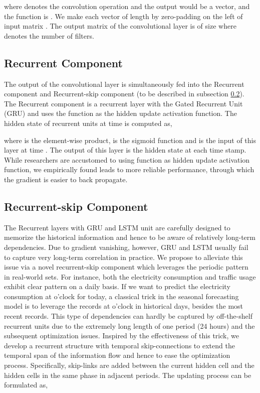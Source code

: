 \documentclass[sigconf]{acmart}
\begin{document}
where  denotes the convolution operation and the output  would be a vector, and the  function is . We make each vector  of length  by zero-padding on the left of input matrix . The output matrix of the convolutional layer is of size 
where  denotes the number of filters.

\subsection{Recurrent Component}
The output of the convolutional layer is simultaneously fed into the Recurrent component and Recurrent-skip component (to be described in subsection \ref{subsec:recurrent-skip}). The Recurrent component is a recurrent layer with the Gated Recurrent Unit (GRU) \cite{chung2014empirical} and uses the  function as the hidden update activation function. The hidden state of recurrent units at time  is computed as,



where  is the element-wise product,  is the sigmoid function and  is the input of this layer at time . The output of this layer is the hidden state at each time stamp. While researchers are accustomed to using  function as hidden update activation function, we empirically found  leads to more reliable performance, through which the gradient is easier to back propagate. 

\subsection{Recurrent-skip Component}
\label{subsec:recurrent-skip}

The Recurrent layers with GRU \cite{chung2014empirical} and LSTM \cite{hochreiter1997long} unit are carefully designed to memorize the historical information and hence to be aware of relatively long-term dependencies. Due to gradient vanishing, however, GRU and LSTM usually fail to capture very long-term correlation in practice. We propose to alleviate this issue via a novel recurrent-skip component which leverages the periodic pattern in real-world sets. For instance, both the electricity consumption and traffic usage exhibit clear pattern on a daily basis. If we want to predict the electricity consumption at  o'clock for today, a classical trick in the seasonal forecasting model is to leverage the records at  o'clock in historical days, besides the most recent records.
This type of dependencies can hardly be captured by off-the-shelf recurrent units due to the extremely long length of one period (24 hours) and the subsequent optimization issues. Inspired by the effectiveness of this trick, we develop a recurrent structure with temporal skip-connections to extend the temporal span of the information flow and hence to ease the optimization process. Specifically, skip-links are added between the current hidden cell and the hidden cells in the same phase in adjacent periods. The updating process can be formulated as,
\end{document}
